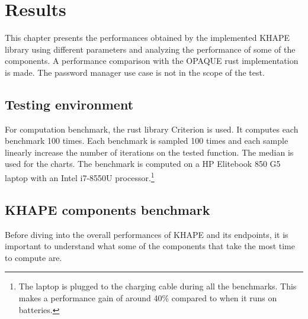 ﻿\documentclass[../report.tex]{subfiles}
\begin{document}
\chapter{Results} %
This chapter presents the performances obtained by the implemented KHAPE library using different parameters and analyzing the performance of some of the components. A performance comparison with the OPAQUE rust implementation \cite{opaque-ke} is made. The password manager use case is not in the scope of the test.
\section{Testing environment}
For computation benchmark, the rust library Criterion is used. It computes each benchmark 100 times.
Each benchmark is sampled 100 times and each sample linearly increase the number of iterations on the tested function.
The median is used for the charts.
The benchmark is computed on a HP Elitebook 850 G5 laptop with an Intel i7-8550U processor.\footnote{The laptop is plugged to the charging cable during all the benchmarks. This makes a performance gain of around 40\% compared to when it runs on batteries.} 


\section{KHAPE components benchmark}
Before diving into the overall performances of KHAPE and its endpoints, it is important to understand what some of the components that take the most time to compute are.
\end{document}

